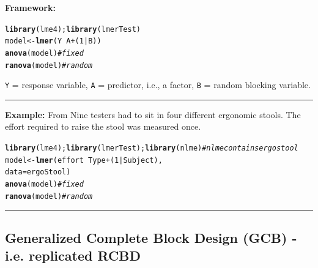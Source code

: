 \documentclass[12pt,english]{article}\usepackage[]{graphicx}\usepackage[table]{xcolor}
\makeatletter
\newcommand{\hlnum}[1]{\textcolor[rgb]{0.686,0.059,0.569}{#1}}%
\newcommand{\hlcom}[1]{\textcolor[rgb]{0.678,0.584,0.686}{\textit{#1}}}%
\newcommand{\hlopt}[1]{\textcolor[rgb]{0,0,0}{#1}}%
\newcommand{\hldef}[1]{\textcolor[rgb]{0.345,0.345,0.345}{#1}}%
\newcommand{\hlkwb}[1]{\textcolor[rgb]{0.69,0.353,0.396}{#1}}%
\newcommand{\hlkwc}[1]{\textcolor[rgb]{0.333,0.667,0.333}{#1}}%
\newcommand{\hlkwd}[1]{\textcolor[rgb]{0.737,0.353,0.396}{\textbf{#1}}}%
\newenvironment{kframe}{%
 \def\at@end@of@kframe{}%
 \ifinner\ifhmode%
  \def\at@end@of@kframe{\end{minipage}}%
  \begin{minipage}{\columnwidth}%
 \fi\fi%
 \def\FrameCommand##1{\hskip\@totalleftmargin \hskip-\fboxsep
 \colorbox{shadecolor}{##1}\hskip-\fboxsep
     \hskip-\linewidth \hskip-\@totalleftmargin \hskip\columnwidth}%
 \MakeFramed {\advance\hsize-\width
   \@totalleftmargin\z@ \linewidth\hsize
   \@setminipage}}%
 {\par\unskip\endMakeFramed%
 \at@end@of@kframe}
\newenvironment{knitrout}{}{} %
\makeatother
\begin{document}
\begin{tcolorbox}[colback=yellow!50!red!25!white,colbacktitle=yellow!50!red,colframe=black!75!white,title=\textbf{R:} RCBD With Random Blocks]
\textbf{Framework:}\\
\vspace{-.2in}
\begin{knitrout}
\color{fgcolor}\begin{kframe}
\begin{alltt}
\hlkwd{library}\hldef{(lme4);} \hlkwd{library}\hldef{(lmerTest)}
\hldef{model} \hlkwb{<-} \hlkwd{lmer}\hldef{(Y} \hlopt{~} \hldef{A} \hlopt{+} \hldef{(}\hlnum{1}\hlopt{|}\hldef{B))}
\hlkwd{anova}\hldef{(model)} \hlcom{# fixed}
\hlkwd{ranova}\hldef{(model)} \hlcom{# random}
\end{alltt}
\end{kframe}
\end{knitrout}
\texttt{Y} = response variable, \texttt{A} = predictor, i.e., a factor, \texttt{B} = random blocking variable.
\vspace{0.1in}
\par\noindent\rule{.9\textwidth}{0.4pt}

\textbf{Example:} From \citep[][]{pinheiro2009} Nine testers had to sit in four different ergonomic stools. The effort required to raise the stool was measured once.
\vspace{-.1in}
\begin{knitrout}
\color{fgcolor}\begin{kframe}
\begin{alltt}
\hlkwd{library}\hldef{(lme4);} \hlkwd{library}\hldef{(lmerTest);} \hlkwd{library}\hldef{(nlme)} \hlcom{#nlme contains ergostool}
\hldef{model} \hlkwb{<-} \hlkwd{lmer}\hldef{(effort} \hlopt{~} \hldef{Type} \hlopt{+} \hldef{(}\hlnum{1} \hlopt{|} \hldef{Subject),}
             \hlkwc{data} \hldef{= ergoStool)}
\hlkwd{anova}\hldef{(model)} \hlcom{# fixed}
\hlkwd{ranova}\hldef{(model)} \hlcom{# random}
\end{alltt}
\end{kframe}
\end{knitrout}
\end{tcolorbox}

\par\noindent\rule{.9\textwidth}{0.4pt}


\subsection{Generalized Complete Block Design (GCB) - i.e. replicated RCBD}
\end{document}
